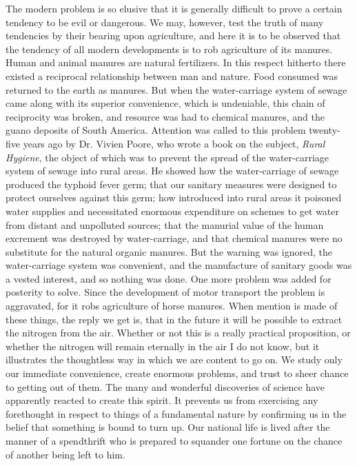 \documentclass{book}
\begin{document}
The modern problem is so elusive that it is generally difficult to prove a certain tendency to be evil or dangerous. We may, however, test the truth of many tendencies by their bearing upon agriculture, and here it is to be observed that the tendency of all modern developments is to rob agriculture of its manures. Human and animal manures are natural fertilizers. In this respect hitherto there existed a reciprocal relationship between man and nature. Food consumed was returned to the earth as manures. But when the water-carriage system of sewage came along with its superior convenience, which is undeniable, this chain of reciprocity was broken, and resource was had to chemical manures, and the guano deposits of South America. Attention was called to this problem twenty-five years ago by Dr. Vivien Poore, who wrote a book on the subject, \emph{Rural Hygiene}, the object of which was to prevent the spread of the water-carriage system of sewage into rural areas. He showed how the water-carriage of sewage produced the typhoid fever germ; that our sanitary measures were designed to protect ourselves against this germ; how introduced into rural areas it poisoned water supplies and necessitated enormous expenditure on schemes to get water from distant and unpolluted sources; that the manurial value of the human excrement was destroyed by water-carriage, and that chemical manures were no substitute for the natural organic manures. But the warning was ignored, the water-carriage system was convenient, and the manufacture of sanitary goods was a vested interest, and so nothing was done. One more problem was added for posterity to solve. Since the development of motor transport the problem is aggravated, for it robs agriculture of horse manures. When mention is made of these things, the reply we get is, that in the future it will be possible to extract the nitrogen from the air. Whether or not this is a really practical proposition, or whether the nitrogen will remain eternally in the air I do not know, but it illustrates the thoughtless way in which we are content to go on. We study only our immediate convenience, create enormous problems, and trust to sheer chance to getting out of them. The many and wonderful discoveries of science have apparently reacted to create this spirit. It prevents us from exercising any forethought in respect to things of a fundamental nature by confirming us in the belief that something is bound to turn up. Our national life is lived after the manner of a spendthrift who is prepared to squander one fortune on the chance of another being left to him.
\end{document}
